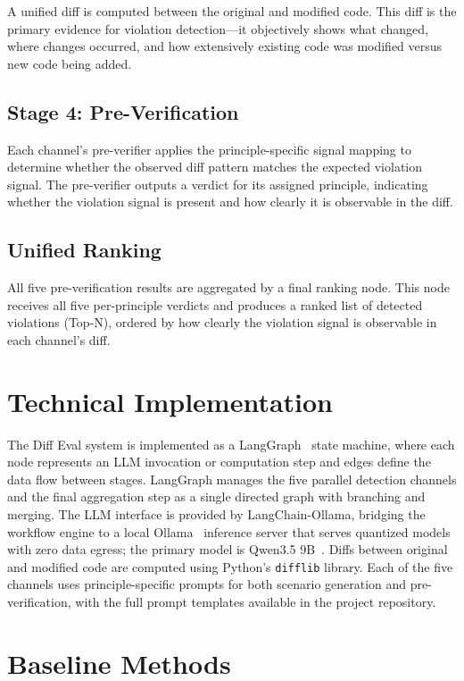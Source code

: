 \documentclass[12pt,a4paper,oneside]{report}
\begin{document}
A unified diff is computed between the original and modified code. This diff is the primary evidence for violation detection---it objectively shows what changed, where changes occurred, and how extensively existing code was modified versus new code being added.

\subsection{Stage 4: Pre-Verification}

Each channel's pre-verifier applies the principle-specific signal mapping to determine whether the observed diff pattern matches the expected violation signal. The pre-verifier outputs a verdict for its assigned principle, indicating whether the violation signal is present and how clearly it is observable in the diff.

\subsection{Unified Ranking}

All five pre-verification results are aggregated by a final ranking node. This node receives all five per-principle verdicts and produces a ranked list of detected violations (Top-N), ordered by how clearly the violation signal is observable in each channel's diff.

\section{Technical Implementation}

The Diff Eval system is implemented as a LangGraph~\cite{LangGraph2024} state machine, where each node represents an LLM invocation or computation step and edges define the data flow between stages. LangGraph manages the five parallel detection channels and the final aggregation step as a single directed graph with branching and merging. The LLM interface is provided by LangChain-Ollama, bridging the workflow engine to a local Ollama~\cite{Ollama2024} inference server that serves quantized models with zero data egress; the primary model is Qwen3.5 9B~\cite{Qwen2025}. Diffs between original and modified code are computed using Python's \texttt{difflib} library. Each of the five channels uses principle-specific prompts for both scenario generation and pre-verification, with the full prompt templates available in the project repository.

\section{Baseline Methods}
\end{document}
